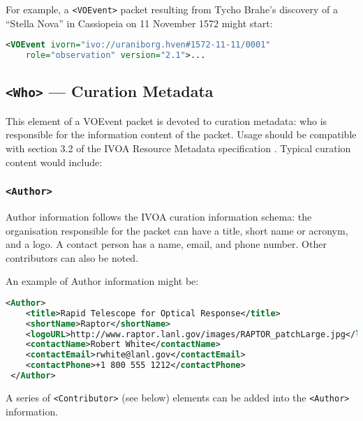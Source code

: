 \documentclass[11pt,a4paper]{ivoa}
\begin{document}
For example, a \verb|<VOEvent>| packet resulting from Tycho Brahe's discovery of
a ``Stella Nova'' in Cassiopeia on 11 November 1572 might start:
\begin{lstlisting}[language=XML]
<VOEvent ivorn="ivo://uraniborg.hven#1572-11-11/0001"
    role="observation" version="2.1">...
\end{lstlisting}

\subsection{\texttt{<Who>} --- Curation Metadata}
\label{sec:3.2}
This element of a VOEvent packet is devoted to curation metadata: who is
responsible for the information content of the packet. Usage should be
compatible with section 3.2 of the IVOA Resource Metadata specification
\citep{2007ivoa.spec.0302H}. Typical curation content would include:

\subsubsection{\texttt{<Author>}}
Author information follows the IVOA curation information schema: the
organisation responsible for the packet can have a title, short name or acronym,
and a logo. A contact person has a name, email, and phone number. Other
contributors can also be noted.

An example of Author information might be:
\begin{lstlisting}[language=XML]
<Author>
    <title>Rapid Telescope for Optical Response</title>
    <shortName>Raptor</shortName>
    <logoURL>http://www.raptor.lanl.gov/images/RAPTOR_patchLarge.jpg</logoURL>
    <contactName>Robert White</contactName>
    <contactEmail>rwhite@lanl.gov</contactEmail>
    <contactPhone>+1 800 555 1212</contactPhone>
 </Author>
\end{lstlisting}

A series of \verb|<Contributor>| (see below) elements can be added into the
\verb|<Author>| information.
\end{document}
